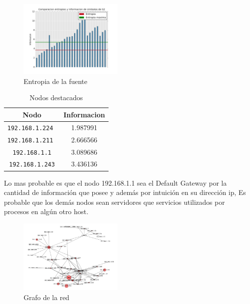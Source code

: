 \begin{figure}[H]
  \centering
    \includegraphics[width=0.45\textwidth]{grafico2-red-taringa.png}
  \caption{Entropia de la fuente}
  \label{entropia-taringa-2}
\end{figure}

    \begin{table}[ht]\begin{center}
      \begin{tabular}{|c|c|}
      \hline
      \textbf{Nodo} & \textbf{Informacion} \\ \hline
      \texttt{192.168.1.224 }& 1.987991 \\ \hline
      \texttt{192.168.1.211 }& 2.666566 \\ \hline
      \texttt{192.168.1.1}& 3.089686 \\ \hline
      \texttt{192.168.1.243}& 3.436136 \\ \hline
      \end{tabular}
      \caption{Nodos destacados}
      \label{Nodos-destacados-taringa}
    \end{center}\end{table}

Lo mas probable es que el nodo 192.168.1.1 sea el Default Gateway por la cantidad de información que posee
y además por intuición en su dirección ip, 
Es probable que los demás nodos sean servidores que servicios utilizados por procesos en algún otro host.

\begin{figure}[H]
  \centering
    \includegraphics[width=0.45\textwidth]{grafico3-red-taringa.png}
  \caption{Grafo de la red}
  \label{grafo-taringa}
\end{figure}

